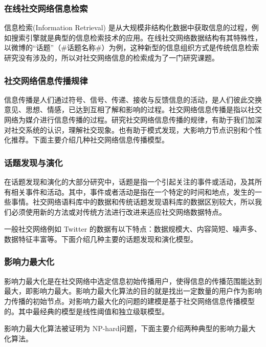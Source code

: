 \documentclass[12pt]{report}
\begin{document}
			\subsubsection{在线社交网络信息检索}
				
				信息检索(Information Retrieval) 是从大规模非结构化数据中获取信息的过程，例如搜索引擎就是典型的信息检索技术的应用。在线社交网络数据结构有其特殊性，以微博的“话题”（\#话题名称\#）为例，这种新型的信息组织方式是传统信息检索研究没有涉及的，所以对社交网络信息的检索成为了一门研究课题。
				
			\subsubsection{社交网络信息传播规律}
				
				信息传播是人们通过符号、信号、传递、接收与反馈信息的活动，是人们彼此交换意见、思想、情感，已达到互相了解和影响的过程。社交网络信息传播是指以社交网络为媒介进行信息传播的过程。研究社交网络信息传播的规律，有助于我们加深对社交系统的认识，理解社交现象。也有助于模式发现，大影响力节点识别和个性化推荐。下面主要介绍几种社交网络信息传播模型。
			
			\subsubsection{话题发现与演化}
			
				在话题发现和演化的大部分研究中，话题是指一个引起关注的事件或活动，及其所有相关事件和活动。其中，事件或者活动是指在一个特定的时间和地点，发生的一些事情。社交网络语料库中的数据和传统话题发现语料库的数据区别较大，所以我们必须使用新的方法或对传统方法进行改进来适应社交网络数据特点。
				
				一般社交网络例如 Twitter 的数据有以下特点：数据规模大、内容简短、噪声多、数据特征丰富等。下面介绍几种主要的话题发现和演化模型。
				
			\subsubsection{影响力最大化}
			
				影响力最大化是在社交网络中选定信息初始传播用户，使得信息的传播范围能达到最大，即影响力最大。影响力最大化算法的目的就是找出一定数量的用户作为影响力传播的初始节点。对影响力最大化的问题的建模是基于社交网络信息传播模型的。其中最经典的模型是线性阈值和独立级联模型。
				
				影响力最大化算法被证明为 NP-hard问题，下面主要介绍两种典型的影响力最大化算法。
				
\end{document}
